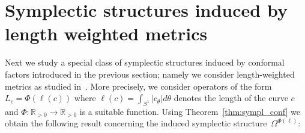 \documentclass[12pt]{amsart}
\newcommand{\rev}[1]{#1}
\theoremstyle{definition}
\newcommand{\R}{\mathbb R}
\def\Ph{\Phi}
\def\R{{\mathbb R}}
\begin{document}


\section{Symplectic structures induced by length weighted metrics}\label{sec:symp_length}
 Next we study a special class of symplectic structures induced by conformal factors introduced in the previous section; namely we consider length-weighted metrics as studied in~\cite{yezzi2005conformal,michor_mumford2006,shah2008H0}. More precisely, we consider  operators of the form  $L_c=\Ph(\rev{\ell(c)})$ where $\rev{\ell(c)}=\int_{S^1}|c_\theta|d\theta$ denotes the length of the curve $c$ and $\Ph: \mathbb R_{> 0}\to \mathbb R_{> 0}$ is a suitable function.
 Using Theorem~\ref{thm:sympl_conf} we obtain the following result concerning the induced symplectic structure~$\Omega^{\Ph(\ell)}$:
\end{document}

